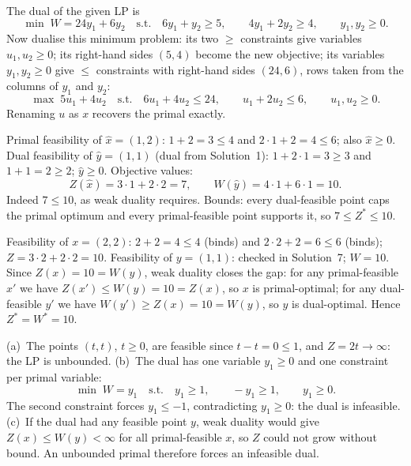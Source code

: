 \begin{solutions}
  \item The dual of the given LP is
        \[
          \min\; W=24y_{1}+6y_{2}
          \quad\text{s.t.}\quad
          6y_{1}+y_{2}\ge 5,\qquad 4y_{1}+2y_{2}\ge 4,\qquad
          y_{1},y_{2}\ge 0 .
        \]
        Now dualise this minimum problem: its two $\ge$ constraints give
        variables $u_{1},u_{2}\ge 0$; its right-hand sides $(5,4)$ become
        the new objective; its variables $y_{1},y_{2}\ge 0$ give $\le$
        constraints with right-hand sides $(24,6)$, rows taken from the
        columns of $y_{1}$ and $y_{2}$:
        \[
          \max\; 5u_{1}+4u_{2}
          \quad\text{s.t.}\quad
          6u_{1}+4u_{2}\le 24,\qquad u_{1}+2u_{2}\le 6,\qquad
          u_{1},u_{2}\ge 0 .
        \]
        Renaming $u$ as $x$ recovers the primal exactly.

  \item Primal feasibility of $\hat{x}=(1,2)$: $1+2=3\le 4$ and
        $2\cdot 1+2=4\le 6$; also $\hat{x}\ge 0$. Dual feasibility of
        $\hat{y}=(1,1)$ (dual from Solution~1): $1+2\cdot 1=3\ge 3$ and
        $1+1=2\ge 2$; $\hat{y}\ge 0$. Objective values:
        \[
          Z(\hat{x})=3\cdot 1+2\cdot 2=7,
          \qquad
          W(\hat{y})=4\cdot 1+6\cdot 1=10 .
        \]
        Indeed $7\le 10$, as weak duality requires. Bounds: every
        dual-feasible point caps the primal optimum and every
        primal-feasible point supports it, so
        $7\le Z^{*}\le 10$.

  \item Feasibility of $x=(2,2)$: $2+2=4\le 4$ (binds) and
        $2\cdot 2+2=6\le 6$ (binds); $Z=3\cdot 2+2\cdot 2=10$.
        Feasibility of $y=(1,1)$: checked in Solution~7; $W=10$.
        Since $Z(x)=10=W(y)$, weak duality closes the gap: for any
        primal-feasible $x'$ we have $Z(x')\le W(y)=10=Z(x)$, so $x$ is
        primal-optimal; for any dual-feasible $y'$ we have
        $W(y')\ge Z(x)=10=W(y)$, so $y$ is dual-optimal. Hence
        $Z^{*}=W^{*}=10$.

  \item (a)~The points $(t,t)$, $t\ge 0$, are feasible since
        $t-t=0\le 1$, and $Z=2t\to\infty$: the LP is unbounded.
        (b)~The dual has one variable $y_{1}\ge 0$ and one constraint per
        primal variable:
        \[
          \min\; W=y_{1}
          \quad\text{s.t.}\quad
          y_{1}\ge 1,\qquad -y_{1}\ge 1,\qquad y_{1}\ge 0 .
        \]
        The second constraint forces $y_{1}\le -1$, contradicting
        $y_{1}\ge 0$: the dual is infeasible.
        (c)~If the dual had any feasible point $y$, weak duality would
        give $Z(x)\le W(y)<\infty$ for all primal-feasible $x$, so $Z$
        could not grow without bound. An unbounded primal therefore
        forces an infeasible dual.


\end{solutions}
